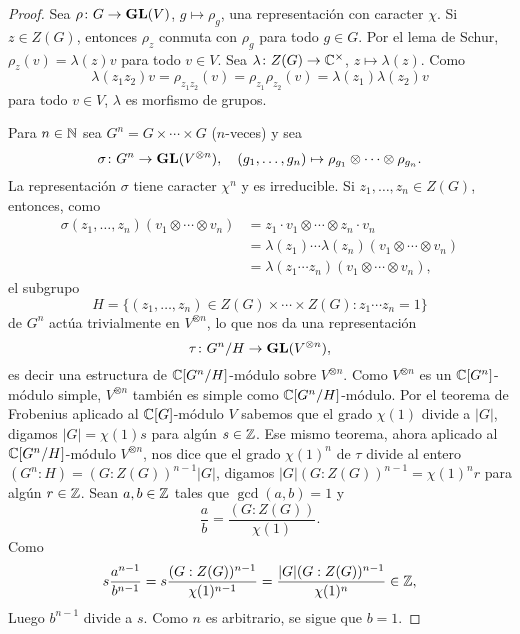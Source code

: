 \begin{proof}
    Sea $\rho\colon G\to\mathbf{GL}(V)$, $g\mapsto\rho_g$, una representación con caracter $\chi$. 
    Si $z\in Z(G)$, entonces $\rho_z$ conmuta con $\rho_g$ para todo $g\in G$. Por el lema de Schur, 
    $\rho_z(v)=\lambda(z)v$ para todo $v\in V$. Sea $\lambda\colon Z(G)\to\mathbb{C}^\times$, $z\mapsto \lambda(z)$. Como 
    \[
    \lambda(z_1z_2)v=\rho_{z_1z_2}(v)=\rho_{z_1}\rho_{z_2}(v)=\lambda(z_1)\lambda(z_2)v
    \]
    para todo $v\in V$, $\lambda$ es morfismo de grupos. 
    
    Para $n\in\mathbb{N}$ sea $G^n=G\times\cdots\times G$ ($n$-veces) y 
    sea 
    \[
    \sigma\colon G^n\to\mathbf{GL}(V^{\otimes n}),
    \quad 
    (g_1,\dots,g_n)\mapsto \rho_{g_1}\otimes\cdots\otimes\rho_{g_n}.
    \]
    La representación $\sigma$ tiene
    caracter $\chi^{n}$ y es irreducible. 
    Si $z_1,\dots,z_n\in Z(G)$, entonces, como 
    \begin{align*}
    \sigma(z_1,\dots,z_n)(v_1\otimes\cdots\otimes v_n)
    &=z_1\cdot v_1\otimes\cdots\otimes z_n\cdot v_n\\
    &=\lambda(z_1)\cdots\lambda(z_n)(v_1\otimes\cdots\otimes v_n)\\
    &=\lambda(z_1\cdots z_n)(v_1\otimes\cdots\otimes v_n),
    \end{align*}
    el subgrupo 
    \[
    H=\{(z_1,\dots,z_n)\in Z(G)\times\cdots\times Z(G):z_1\cdots z_n=1\}
    \]
    de $G^n$ actúa trivialmente
    en $V^{\otimes n}$, lo que nos da una representación 
    \[
    \tau\colon G^n/H\to\mathbf{GL}(V^{\otimes n}),
    \]
    es decir una
    estructura de $\mathbb{C}[G^n/H]$-módulo sobre $V^{\otimes n}$. Como $V^{\otimes n}$ 
    es un $\mathbb{C}[G^n]$-módulo simple, $V^{\otimes n}$ también es simple como $\mathbb{C}[G^n/H]$-módulo. 
    Por el teorema de Frobenius aplicado al $\mathbb{C}[G]$-módulo $V$ sabemos que 
    el grado $\chi(1)$ divide a $|G|$, digamos $|G|=\chi(1)s$ para algún $s\in\mathbb{Z}$. 
    Ese mismo teorema, ahora 
    aplicado al $\mathbb{C}[G^n/H]$-módulo $V^{\otimes n}$, nos dice que
    el grado $\chi(1)^n$ de $\tau$ 
    divide al entero $(G^n:H)=(G:Z(G))^{n-1}|G|$, digamos $|G|(G:Z(G))^{n-1}=\chi(1)^nr$ para algún $r\in\mathbb{Z}$. 
    Sean $a,b\in\mathbb{Z}$ tales que $\gcd(a,b)=1$ y 
    \[
    \frac{a}{b}=\frac{(G:Z(G))}{\chi(1)}.
    \]
    Como 
    \[
    s\frac{a^{n-1}}{b^{n-1}}=s\frac{(G:Z(G))^{n-1}}{\chi(1)^{n-1}}=\frac{|G|(G:Z(G))^{n-1}}{\chi(1)^n}\in\mathbb{Z},
    \]
    Luego $b^{n-1}$ divide a $s$. Como $n$ es arbitrario, se sigue que $b=1$. 
\end{proof}

